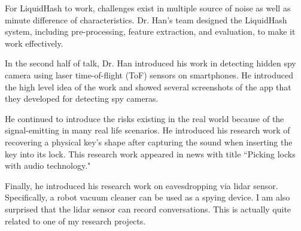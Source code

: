 \documentclass[11pt, oneside]{article}   	%
\begin{document}
For LiquidHash to work,  challenges exist in multiple source of noise as well as minute difference of characteristics. Dr. Han's team designed the LiquidHash system, including pre-processing, feature extraction, and evaluation, to make it work effectively.

In the second half of talk, Dr. Han introduced his work in detecting hidden spy camera using laser time-of-flight (ToF) sensors on smartphones. He introduced the high level idea of the work and showed several screenshots of the app that they developed for detecting spy cameras. 

He continued to introduce the risks existing in the real world because of the signal-emitting in many real life scenarios. He introduced his research work of recovering a physical key's shape after capturing the sound when inserting the key into its lock. This research work appeared in news with title ``Picking locks with audio technology."

Finally, he introduced his research work on eavesdropping via lidar sensor. Specifically, a robot vacuum cleaner can be used as a spying device. I am also surprised that the lidar sensor can record conversations. This is actually quite related to one of my research projects.
\end{document}
